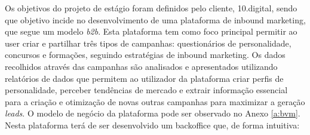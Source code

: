 Os objetivos do projeto de estágio foram definidos pelo cliente, 10.digital, sendo que objetivo incide no desenvolvimento de uma plataforma de inbound marketing, que segue um modelo \textit{\gls{b2b}}. Esta plataforma tem como foco principal permitir ao \gls{user} criar e partilhar três tipos de campanhas: questionários de personalidade, concursos e formações, seguindo estratégias de inbound marketing. Os dados recolhidos através das campanhas são analisados e apresentados utilizando relatórios de dados que permitem ao utilizador da plataforma criar perfis de personalidade, perceber tendências de mercado e extrair informação essencial para a criação e otimização de novas outras campanhas para maximizar a geração \textit{leads}. O modelo de negócio da plataforma pode ser observado no Anexo \ref{a:bvm}. Nesta plataforma terá de ser desenvolvido um \gls{backoffice} que, de forma intuitiva:
